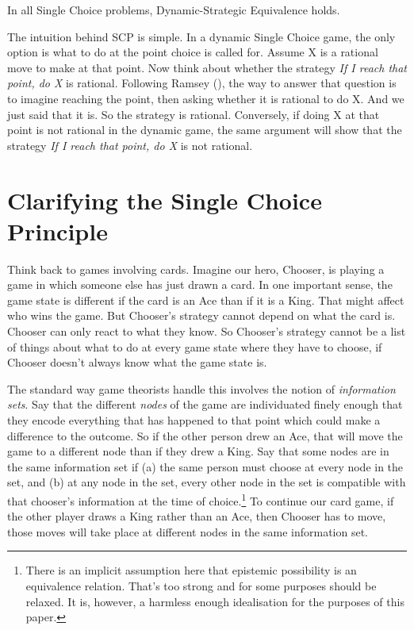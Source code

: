 \documentclass[
  11pt,
  letterpaper,
  DIV=11,
  numbers=noendperiod,
  twoside]{scrartcl}
\providecommand{\tightlist}{%
  \setlength{\itemsep}{0pt}\setlength{\parskip}{0pt}}
\begin{document}
\begin{description}
\tightlist
\item[Single Choice Principle (SCP)]
In all Single Choice problems, Dynamic-Strategic Equivalence holds.
\end{description}

The intuition behind SCP is simple. In a dynamic Single Choice game, the
only option is what to do at the point choice is called for. Assume X is
a rational move to make at that point. Now think about whether the
strategy \emph{If I reach that point, do X} is rational. Following
Ramsey (), the way to
answer that question is to imagine reaching the point, then asking
whether it is rational to do X. And we just said that it is. So the
strategy is rational. Conversely, if doing X at that point is not
rational in the dynamic game, the same argument will show that the
strategy \emph{If I reach that point, do X} is not rational.

\section{Clarifying the Single Choice Principle}\label{sec-scp-clarify}

Think back to games involving cards. Imagine our hero, Chooser, is
playing a game in which someone else has just drawn a card. In one
important sense, the game state is different if the card is an Ace than
if it is a King. That might affect who wins the game. But Chooser's
strategy cannot depend on what the card is. Chooser can only react to
what they know. So Chooser's strategy cannot be a list of things about
what to do at every game state where they have to choose, if Chooser
doesn't always know what the game state is.

The standard way game theorists handle this involves the notion of
\emph{information sets}. Say that the different \emph{nodes} of the game
are individuated finely enough that they encode everything that has
happened to that point which could make a difference to the outcome. So
if the other person drew an Ace, that will move the game to a different
node than if they drew a King. Say that some nodes are in the same
information set if (a) the same person must choose at every node in the
set, and (b) at any node in the set, every other node in the set is
compatible with that chooser's information at the time of
choice.\footnote{There is an implicit assumption here that epistemic
  possibility is an equivalence relation. That's too strong and for some
  purposes should be relaxed. It is, however, a harmless enough
  idealisation for the purposes of this paper.} To continue our card
game, if the other player draws a King rather than an Ace, then Chooser
has to move, those moves will take place at different nodes in the same
information set.
\end{document}
